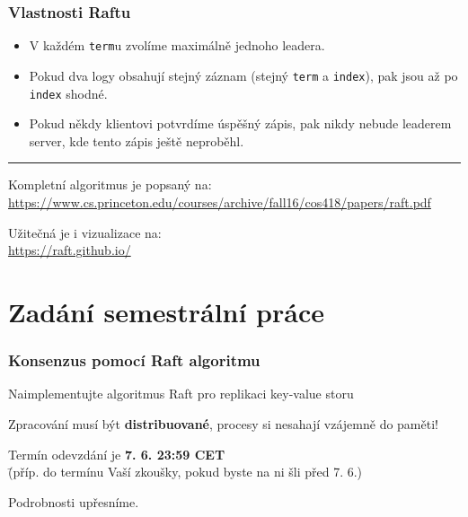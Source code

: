 \documentclass[usenames,dvipsnames,9pt]{beamer}
\begin{document}
\begin{frame}
  \frametitle{Vlastnosti Raftu}

  \begin{itemize}
    \item V každém \texttt{term}u zvolíme maximálně jednoho leadera. \\[1em]

    \pause
    \item Pokud dva logy obsahují stejný záznam (stejný \texttt{term} a \texttt{index}), pak jsou až po \texttt{index} shodné. \\[1em]

    \pause
    \item Pokud někdy klientovi potvrdíme úspěšný zápis, pak nikdy nebude leaderem server, kde tento zápis ještě neproběhl. \\[1em]
  \end{itemize}

  \pause\vspace{2em}\hrule\vspace{1em}

  Kompletní algoritmus je popsaný na:\\
  \url{https://www.cs.princeton.edu/courses/archive/fall16/cos418/papers/raft.pdf}

  \pause\vspace{1em}

  Užitečná je i vizualizace na:\\
  \url{https://raft.github.io/}
\end{frame}

\section{Zadání semestrální práce}


\begin{frame}
  \frametitle{Konsenzus pomocí Raft algoritmu}
 Naimplementujte algoritmus Raft pro replikaci key-value storu

 \vspace{2em}

  Zpracování musí být {\bf distribuované}, procesy si nesahají vzájemně do paměti!


    \pause\vspace{1.5em}

  \begin{tabbing}
      Termín odevzdání je \={\bf 7. 6. 23:59 CET} \\
                          \={(příp. do termínu Vaší zkoušky, pokud byste na ni šli před 7. 6.)}
    \end{tabbing}

\raggedleft Podrobnosti upřesníme.


\end{frame}


\framefeedback{}
\end{document}
